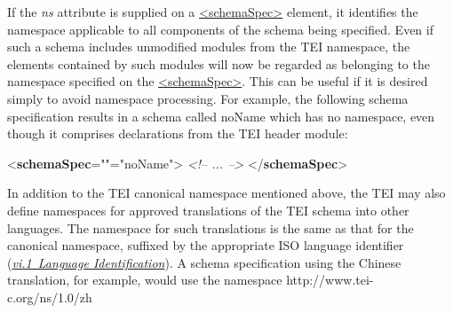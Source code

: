 If the {\itshape ns} attribute is supplied on a \hyperref[TEI.schemaSpec]{<schemaSpec>} element, it identifies the namespace applicable to all components of the schema being specified. Even if such a schema includes unmodified modules from the TEI namespace, the elements contained by such modules will now be regarded as belonging to the namespace specified on the \hyperref[TEI.schemaSpec]{<schemaSpec>}. This can be useful if it is desired simply to avoid namespace processing. For example, the following schema specification results in a schema called \textsf{noName} which has no namespace, even though it comprises declarations from the TEI \textsf{header} module: \par\bgroup{}\exampleFont \begin{shaded}\noindent\mbox{}{<\textbf{schemaSpec}\hspace*{1em}{ns}="{}"\hspace*{1em}{ident}="{noName}">}\mbox{}\newline 
{}\mbox{}\newline 
\textit{<!-- ... -->}\mbox{}\newline 
{</\textbf{schemaSpec}>}\end{shaded}\egroup\par \par
In addition to the TEI canonical namespace mentioned above, the TEI may also define namespaces for approved translations of the TEI schema into other languages.  The namespace for such translations is the same as that for the canonical namespace, suffixed by the appropriate ISO language identifier (\textit{\hyperref[CHSH]{vi.1\ Language Identification}}). A schema specification using the Chinese translation, for example, would use the namespace \textsf{http://www.tei-c.org/ns/1.0/zh}
